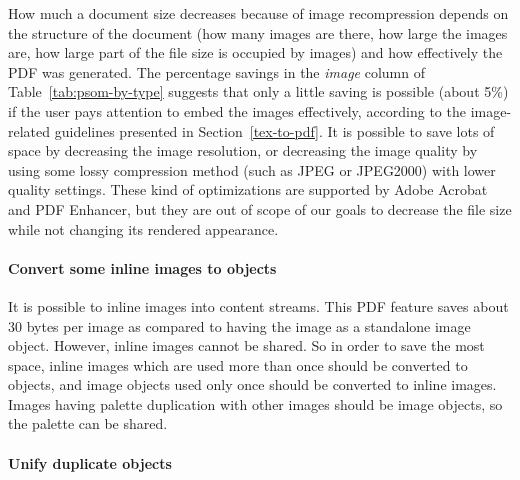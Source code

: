 \documentclass{ltugproc}
\begin{document}
How much a document size decreases because of image recompression depends on
the structure of the document (how many images are there, how large the
images are, how large part of the file size is occupied by images) and how
effectively the PDF was generated. The percentage savings in the
\emph{image} column of Table~\ref{tab:psom-by-type} suggests that only a little
saving is possible (about 5\%) if the user pays attention to embed the
images effectively, according to the image-related guidelines presented in
Section~\ref{tex-to-pdf}. It is possible to save lots of space by decreasing
the image resolution, or decreasing the image quality by using some lossy
compression method (such as JPEG or JPEG2000) with lower quality settings.
These kind of optimizations are supported by Adobe Acrobat and PDF Enhancer,
but they are out of scope of our goals to decrease the file size while not
changing its rendered appearance.

\paragraph{Convert some inline images to objects}

It is possible to inline images into content streams. This PDF feature saves
about 30 bytes per image as compared to having the image as a standalone
image object. However, inline images cannot be shared. So in order to save
the most space, inline images which are used more than once should be
converted to objects, and image objects used only once should be converted
to inline images. Images having palette duplication with other images should
be image objects, so the palette can be shared.

\paragraph{Unify duplicate objects}
\end{document}
